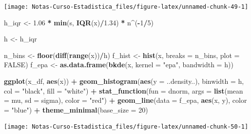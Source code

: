 \documentclass[
  12pt,
]{book}
\newenvironment{Shaded}{\begin{snugshade}}{\end{snugshade}}
\newcommand{\DataTypeTok}[1]{\textcolor[rgb]{0.13,0.29,0.53}{#1}}
\newcommand{\DecValTok}[1]{\textcolor[rgb]{0.00,0.00,0.81}{#1}}
\newcommand{\FloatTok}[1]{\textcolor[rgb]{0.00,0.00,0.81}{#1}}
\newcommand{\KeywordTok}[1]{\textcolor[rgb]{0.13,0.29,0.53}{\textbf{#1}}}
\newcommand{\NormalTok}[1]{#1}
\newcommand{\OperatorTok}[1]{\textcolor[rgb]{0.81,0.36,0.00}{\textbf{#1}}}
\newcommand{\OtherTok}[1]{\textcolor[rgb]{0.56,0.35,0.01}{#1}}
\newcommand{\StringTok}[1]{\textcolor[rgb]{0.31,0.60,0.02}{#1}}
\theoremstyle{definition}
\theoremstyle{definition}
\theoremstyle{definition}
\theoremstyle{remark}
\begin{document}
\begin{center}\texttt{[image: Notas-Curso-Estadistica\_files/figure-latex/unnamed-chunk-49-1]} \end{center}

\begin{Shaded}
\begin{Highlighting}[]
\NormalTok{h_iqr <-}\StringTok{ }\FloatTok{1.06} \OperatorTok{*}\StringTok{ }\KeywordTok{min}\NormalTok{(s, }\KeywordTok{IQR}\NormalTok{(x)}\OperatorTok{/}\FloatTok{1.34}\NormalTok{) }\OperatorTok{*}\StringTok{ }\NormalTok{n}\OperatorTok{^}\NormalTok{(}\OperatorTok{-}\DecValTok{1}\OperatorTok{/}\DecValTok{5}\NormalTok{)}

\NormalTok{h <-}\StringTok{ }\NormalTok{h_iqr}

\NormalTok{n_bins <-}\StringTok{ }\KeywordTok{floor}\NormalTok{(}\KeywordTok{diff}\NormalTok{(}\KeywordTok{range}\NormalTok{(x))}\OperatorTok{/}\NormalTok{h)}
\NormalTok{f_hist <-}\StringTok{ }\KeywordTok{hist}\NormalTok{(x, }\DataTypeTok{breaks =}\NormalTok{ n_bins, }\DataTypeTok{plot =} \OtherTok{FALSE}\NormalTok{)}
\NormalTok{f_epa <-}\StringTok{ }\KeywordTok{as.data.frame}\NormalTok{(}\KeywordTok{bkde}\NormalTok{(x, }\DataTypeTok{kernel =} \StringTok{"epa"}\NormalTok{, }\DataTypeTok{bandwidth =}\NormalTok{ h))}

\KeywordTok{ggplot}\NormalTok{(x_df, }\KeywordTok{aes}\NormalTok{(x)) }\OperatorTok{+}\StringTok{ }\KeywordTok{geom_histogram}\NormalTok{(}\KeywordTok{aes}\NormalTok{(}\DataTypeTok{y =}\NormalTok{ ..density..), }
    \DataTypeTok{binwidth =}\NormalTok{ h, }\DataTypeTok{col =} \StringTok{"black"}\NormalTok{, }\DataTypeTok{fill =} \StringTok{"white"}\NormalTok{) }\OperatorTok{+}\StringTok{ }
\StringTok{    }\KeywordTok{stat_function}\NormalTok{(}\DataTypeTok{fun =}\NormalTok{ dnorm, }\DataTypeTok{args =} \KeywordTok{list}\NormalTok{(}\DataTypeTok{mean =}\NormalTok{ mu, }
        \DataTypeTok{sd =}\NormalTok{ sigma), }\DataTypeTok{color =} \StringTok{"red"}\NormalTok{) }\OperatorTok{+}\StringTok{ }\KeywordTok{geom_line}\NormalTok{(}\DataTypeTok{data =}\NormalTok{ f_epa, }
    \KeywordTok{aes}\NormalTok{(x, y), }\DataTypeTok{color =} \StringTok{"blue"}\NormalTok{) }\OperatorTok{+}\StringTok{ }\KeywordTok{theme_minimal}\NormalTok{(}\DataTypeTok{base_size =} \DecValTok{20}\NormalTok{)}
\end{Highlighting}
\end{Shaded}

\begin{center}\texttt{[image: Notas-Curso-Estadistica\_files/figure-latex/unnamed-chunk-50-1]} \end{center}
\end{document}
